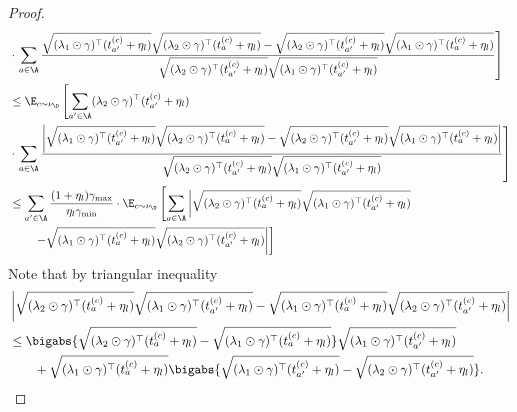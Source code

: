 \documentclass{article}
\newcommand{\1}{\mathbf{1}}
\begin{document}
\begin{proof}
{\begin{align}
    &\cdot\left.\sum_{a \in \A} \frac{\sqrt{(\lambda_{1}\odot\gamma)^{\top} (t_{a^{\prime}}^{(c)}+\eta_l)}\sqrt{(\lambda_{2}\odot\gamma)^{\top} (t_{a}^{(c)}+\eta_l)}-\sqrt{(\lambda_{2}\odot\gamma)^{\top} (t_{a'}^{(c)}+\eta_l)}\sqrt{(\lambda_{1}\odot\gamma)^{\top} (t_{a}^{(c)}+\eta_l)}}{\sqrt{(\lambda_{2}\odot\gamma)^{\top} (t_{a^{\prime}}^{(c)}+\eta_l)}\sqrt{(\lambda_{1}\odot\gamma)^{\top} (t_{a^{\prime}}^{(c)}+\eta_l)}}\right]\nonumber\\
    &\leq \E_{c\sim\nu_\D}\left[\sum_{a^{\prime} \in \A}(\lambda_{2}\odot\gamma)^{\top} (t_{a^{\prime}}^{(c)}+\eta_l) \right.\nonumber\\
    &\cdot\left.\sum_{a \in \A} \frac{\left|\sqrt{(\lambda_{1}\odot\gamma)^{\top} (t_{a^{\prime}}^{(c)}+\eta_l)}\sqrt{(\lambda_{2}\odot\gamma)^{\top} (t_{a}^{(c)}+\eta_l)}-\sqrt{(\lambda_{2}\odot\gamma)^{\top} (t_{a'}^{(c)}+\eta_l)}\sqrt{(\lambda_{1}\odot\gamma)^{\top} (t_{a}^{(c)}+\eta_l)}\right|}{\sqrt{(\lambda_{2}\odot\gamma)^{\top} (t_{a^{\prime}}^{(c)}+\eta_l)}\sqrt{(\lambda_{1}\odot\gamma)^{\top} (t_{a^{\prime}}^{(c)}+\eta_l)}}\right]\nonumber\\
    &\leq \sum_{a^{\prime} \in \A}\frac{(1+\eta_l)\gamma_{\max}}{\eta_l\gamma_{\min}} \cdot\E_{c\sim\nu_\D}\left[\sum_{a \in \A} \left|\sqrt{(\lambda_{2}\odot\gamma)^{\top} (t_{a}^{(c)}+\eta_l)}\sqrt{(\lambda_{1}\odot\gamma)^{\top} (t_{a^{\prime}}^{(c)}+\eta_l)}\right.\right.\nonumber\\
    &\qquad\left.\left.-\sqrt{(\lambda_{1}\odot\gamma)^{\top} (t_{a}^{(c)}+\eta_l)}\sqrt{(\lambda_{2}\odot\gamma)^{\top} (t_{a^{\prime}}^{(c)}+\eta_l)}\right|\right]\label{eqn:par}
\end{align}
}
Note that by triangular inequality
\begin{align*}
    &\left|\sqrt{(\lambda_{2}\odot\gamma)^{\top} (t_{a}^{(c)}+\eta_l)}\sqrt{(\lambda_{1}\odot\gamma)^{\top} (t_{a^{\prime}}^{(c)}+\eta_l)}-\sqrt{(\lambda_{1}\odot\gamma)^{\top} (t_{a}^{(c)}+\eta_l)}\sqrt{(\lambda_{2}\odot\gamma)^{\top} (t_{a'}^{(c)}+\eta_l)}\right|\\
    &\leq\bigabs{\sqrt{(\lambda_{2}\odot\gamma)^{\top} (t_{a}^{(c)}+\eta_l)}-\sqrt{(\lambda_{1}\odot\gamma)^{\top} (t_{a}^{(c)}+\eta_l)}}\sqrt{(\lambda_{1}\odot\gamma)^{\top} (t_{a^{\prime}}^{(c)}+\eta_l)}\\
    &\qquad+\sqrt{(\lambda_{1}\odot\gamma)^{\top} (t_{a}^{(c)}+\eta_l)}\bigabs{\sqrt{(\lambda_{1}\odot\gamma)^{\top} (t_{a^{\prime}}^{(c)}+\eta_l)}-\sqrt{(\lambda_{2}\odot\gamma)^{\top} (t_{a^{\prime}}^{(c)}+\eta_l)}}.
\end{align*}

\end{proof}
\end{document}
